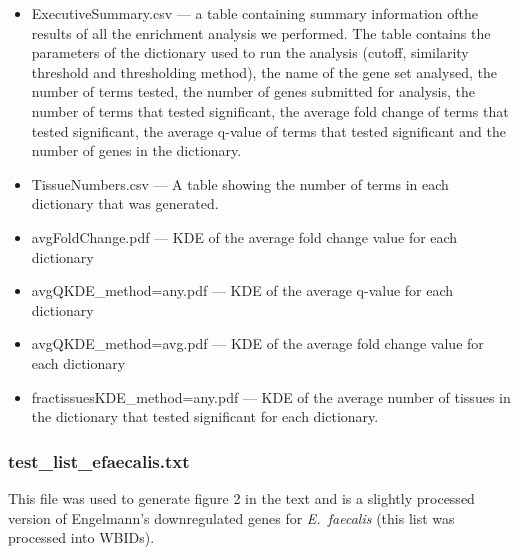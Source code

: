 \documentclass{article}
\begin{document}
	\begin{itemize}
		\item ExecutiveSummary.csv --- a table containing summary information ofthe results of all the enrichment analysis we performed. The table contains the parameters of the dictionary used to run the analysis (cutoff, similarity threshold and thresholding method), the name of the gene set analysed, the number of terms tested, the number of genes submitted for analysis, the number of terms that tested significant, the average fold change of terms that tested significant, the average q-value of terms that tested significant and the number of genes in the dictionary.
		\item TissueNumbers.csv --- A table showing the number of terms in each dictionary that was generated. 
		\item avgFoldChange.pdf --- KDE of the average fold change value for each dictionary
		\item avgQKDE\_method=any.pdf --- KDE of the average q-value for each dictionary 
		\item avgQKDE\_method=avg.pdf --- KDE of the average fold change value for each dictionary
		\item fractissuesKDE\_method=any.pdf --- KDE of the average number of tissues in the dictionary that tested significant for each dictionary. 
	\end{itemize}


\subsubsection*{test\_list\_efaecalis.txt}
This file was used to generate figure 2 in the text and is a slightly processed version of Engelmann's downregulated genes for \emph{E.~faecalis} (this list was processed into WBIDs).


\end{document}
